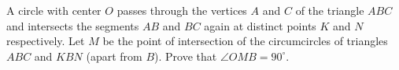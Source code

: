 A circle with center $O$ passes through the vertices $A$ and $C$ of the triangle $ABC$ and intersects the segments $AB$ and $BC$ again at distinct points $K$ and $N$ respectively. Let $M$ be the point of intersection of the circumcircles of triangles $ABC$ and $KBN$ (apart from $B$). Prove that $\angle OMB=90^{\circ}$.
